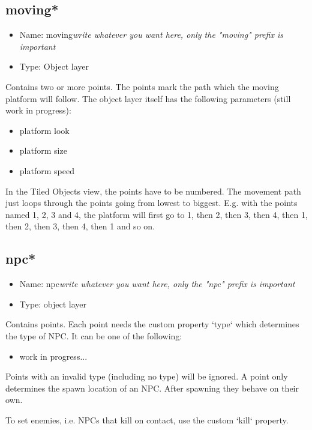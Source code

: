 \documentclass{article}
\begin{document}
\subsection{moving*}
\begin{itemize}
	\item Name: moving\textit{write whatever you want here, only the "moving" prefix is important}
	\item Type: Object layer
\end{itemize}

Contains two or more points. The points mark the path which the moving platform will follow. The object layer itself has the following parameters (still work in progress):
\begin{itemize}
 	\item platform look
 	\item platform size
 	\item platform speed
\end{itemize}

In the Tiled Objects view, the points have to be numbered. The movement path just loops through the points going from lowest to biggest. E.g. with the points named 1, 2, 3 and 4, the platform will first go to 1, then 2, then 3, then 4, then 1, then 2, then 3, then 4, then 1 and so on.

\subsection{npc*}
\begin{itemize}
	\item Name: npc\textit{write whatever you want here, only the "npc" prefix is important}
	\item Type: object layer
\end{itemize}

Contains points. Each point needs the custom property `type` which determines the type of NPC. It can be one of the following:
\begin{itemize}
 	\item work in progress...
\end{itemize}
Points with an invalid type (including no type) will be ignored.
A point only determines the spawn location of an NPC. After spawning they behave on their own.

To set enemies, i.e. NPCs that kill on contact, use the custom `kill` property.
\end{document}
